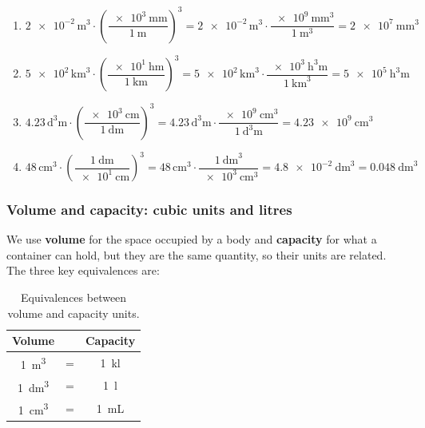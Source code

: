 \begin{exercise}
\begin{solu}
\begin{enumerate}[label=\alph*)]
            \item \(\num{2e-2}\,\unit{\cubic\m} \cdot \left(\dfrac{\qty{e3}{\mm}}{\qty{1}{\m}}\right)^{3} = \num{2e-2}\,\unit{\cubic\m} \cdot \dfrac{\qty{e9}{\cubic\mm}}{\qty{1}{\cubic\m}} = \qty{2e7}{\cubic\mm}\)
            \item \(\num{5e2}\,\unit{\cubic\km} \cdot \left(\dfrac{\qty{e1}{\hecto\m}}{\qty{1}{\km}}\right)^{3} = \num{5e2}\,\unit{\cubic\km} \cdot \dfrac{\qty{e3}{\cubic\hecto\m}}{\qty{1}{\cubic\km}} = \qty{5e5}{\cubic\hecto\m}\)
            \item \(\num{4.23}\,\unit{\cubic\deca\m} \cdot \left(\dfrac{\qty{e3}{\cm}}{\qty{1}{\deca\m}}\right)^{3} = \num{4.23}\,\unit{\cubic\deca\m} \cdot \dfrac{\qty{e9}{\cubic\cm}}{\qty{1}{\cubic\deca\m}} = \qty{4.23e9}{\cubic\cm}\)
            \item \(\num{48}\,\unit{\cubic\cm} \cdot \left(\dfrac{\qty{1}{\dm}}{\qty{e1}{\cm}}\right)^{3} = \num{48}\,\unit{\cubic\cm} \cdot \dfrac{\qty{1}{\cubic\dm}}{\qty{e3}{\cubic\cm}} = \qty{4.8e-2}{\cubic\dm} = \qty{0.048}{\cubic\dm}\)
        \end{enumerate}
    \end{solu}
\end{exercise}


\subsubsection{Volume and capacity: cubic units and litres}

We use \textbf{volume} for the space occupied by a body and \textbf{capacity} for what a container can hold, but they are the same quantity, so their units are related. The three key equivalences are:

\begin{table}[H]
    \centering
    \renewcommand{\arraystretch}{1.4}
    \begin{tabular}{ccc}
        \toprule
        \textbf{Volume} & & \textbf{Capacity} \\
        \midrule
        \qty{1}{\cubic\m} & = & \qty{1}{\kilo\litre} \\
        \qty{1}{\cubic\dm} & = & \qty{1}{\litre} \\
        \qty{1}{\cubic\cm} & = & \qty{1}{\mL} \\
        \bottomrule
    \end{tabular}
    \caption{Equivalences between volume and capacity units.}
    \label{tab:u1_volume_capacity}
\end{table}

